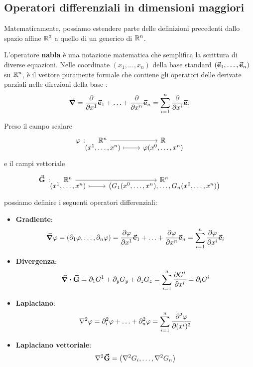 \subsection{Operatori differenziali in dimensioni maggiori}
Matematicamente, possiamo estendere parte delle definizioni precedenti dallo spazio affine $\mathbb{R}^3$ a quello di un generico di $\mathbb{R}^n$.
\begin{define}
	L'operatore \textbf{nabla}	è una notazione matematica che semplifica la scrittura di diverse equazioni. Nelle coordinate $(x_1,\ldots,x_n)$ della base standard $\left(\vb*{\va{e}}_1,\ldots,\vb*{\va{e}}_n\right)$ su $\mathbb{R}^n$, è il vettore puramente formale che contiene gli operatori delle derivate parziali nelle direzioni della base :
	\begin{equation}
		\grad = \pdv{x^1}\vb*{\va{e}}_1+\ldots+\pdv{x^n}\vb*{\va{e}}_n=\sum_{i=1}^n\pdv{x^i}\vb*{\va{e}}_i\label{nablacartesianondim}
	\end{equation}
\end{define}
Preso il campo scalare
\begin{equation}
	\funztot[\phi]{\realset^n}{\realset}{(x^1,\ldots,x^n)}{\phi(x^0,\ldots,x^n)}
\end{equation}
e il campi vettoriale
\begin{equation}
	\funztot[\vba{G}]{\realset^n}{\realset^n}{(x^1,\ldots,x^n)}{\left(G_1(x^0,\ldots,x^n),\ldots,G_n(x^0,\ldots,x^n)\right)}
\end{equation}
possiamo definire i seguenti operatori differenziali:
\begin{itemize}
	\item \textbf{Gradiente}:
	\begin{equation}
		\grad{\varphi}=\left(\partial_1\varphi,\ldots,\partial_n\varphi\right)=\pdv{\varphi}{x^1}\vb*{\va{e}}_1+\ldots+\pdv{\varphi}{x^n}\vb*{\va{e}}_n=\sum_{i=1}^n\pdv{\varphi}{x^i}\vb*{\va{e}}_i
	\end{equation}
	\item \textbf{Divergenza}:
	\begin{equation}
		\div{\vb*{\va{G}}}=\partial_1G^1+\partial_yG_y+\partial_zG_z=\sum_{i=1}^n\pdv{G^i}{x^i}=\partial_iG^i
	\end{equation}
	\item \textbf{Laplaciano}:
	\begin{equation}
		\laplacian{\phi}=\partial^2_i\phi+\ldots+\partial^2_n\phi=\sum_{i=1}^n\pdv[2]{\phi}{(x^i)}\label{laplacianocartesianondim}
	\end{equation}
	\item \textbf{Laplaciano vettoriale}:
	\begin{equation}
		\laplacian{\vba{G}}=\left(\laplacian{G_i},\ldots,\laplacian{G_n}\right)
	\end{equation}
\end{itemize}
